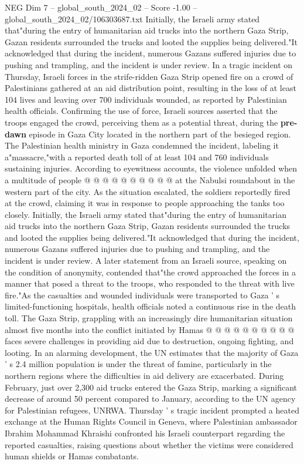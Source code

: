 \begin{textsample}{NEG Dim 7 – global\_south\_2024\_02 – Score -1.00 – global\_south\_2024\_02/106303687.txt}  \label{ex:f7_neg_250}
Initially, the Israeli army stated that"during the entry of humanitarian aid trucks into the northern Gaza Strip, Gazan residents surrounded the trucks and looted the supplies being delivered."It acknowledged that during the incident, numerous Gazans suffered injuries due to pushing and trampling, and the incident is under review.
In a tragic incident on Thursday, Israeli forces in the strife-ridden Gaza Strip opened fire on a crowd of Palestinians gathered at an aid distribution point, resulting in the loss of at least 104 lives and leaving over 700 individuals wounded, as reported by Palestinian health officials.
Confirming the use of force, Israeli sources asserted that the troops engaged the crowd, perceiving them as a potential threat, during the \textbf{pre-dawn} episode in Gaza City located in the northern part of the besieged region.
The Palestinian health ministry in Gaza condemned the incident, labeling it a"massacre,"with a reported death toll of at least 104 and 760 individuals sustaining injuries.
According to eyewitness accounts, the violence unfolded when a multitude of people @ @ @ @ @ @ @ @ @ @ at the Nabulsi roundabout in the western part of the city.
As the situation escalated, the soldiers reportedly fired at the crowd, claiming it was in response to people approaching the tanks too closely.
Initially, the Israeli army stated that"during the entry of humanitarian aid trucks into the northern Gaza Strip, Gazan residents surrounded the trucks and looted the supplies being delivered."It acknowledged that during the incident, numerous Gazans suffered injuries due to pushing and trampling, and the incident is under review.
A later statement from an Israeli source, speaking on the condition of anonymity, contended that"the crowd approached the forces in a manner that posed a threat to the troops, who responded to the threat with live fire."As the casualties and wounded individuals were transported to Gaza ' s limited-functioning hospitals, health officials noted a continuous rise in the death toll.
The Gaza Strip, grappling with an increasingly dire humanitarian situation almost five months into the conflict initiated by Hamas @ @ @ @ @ @ @ @ @ @ faces severe challenges in providing aid due to destruction, ongoing fighting, and looting.
In an alarming development, the UN estimates that the majority of Gaza ' s 2.4 million population is under the threat of famine, particularly in the northern regions where the difficulties in aid delivery are exacerbated.
During February, just over 2,300 aid trucks entered the Gaza Strip, marking a significant decrease of around 50 percent compared to January, according to the UN agency for Palestinian refugees, UNRWA.
Thursday ' s tragic incident prompted a heated exchange at the Human Rights Council in Geneva, where Palestinian ambassador Ibrahim Mohammad Khraishi confronted his Israeli counterpart regarding the reported casualties, raising questions about whether the victims were considered human shields or Hamas combatants.

\end{textsample}
